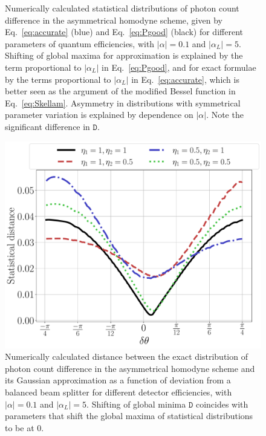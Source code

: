 \begin{figure}
\begin{minipage}[c]{.45\linewidth}
\end{minipage}
    \caption{
    Numerically calculated statistical distributions of photon count difference in the asymmetrical homodyne scheme, given by  Eq.~\eqref{eq:accurate} (blue) and Eq.~\eqref{eq:Pgood} (black) for different parameters of quantum efficiencies, with $|\alpha|=0.1$ and $|\alpha_L|=5$. Shifting of global maxima for approximation is explained by the term proportional to $|\alpha_L|$ in Eq.~\eqref{eq:Pgood}, and for exact formulae by the terms proportional to $|\alpha_L|$ in Eq.~\eqref{eq:accurate}, which is better seen as the argument of the modified Bessel function in Eq.~\eqref{eq:Skellam}. Asymmetry in distributions with symmetrical parameter variation is explained by dependence on $|\alpha|$. Note the significant difference in $\mathtt{D}$.
    }\label{fig:PLACEHOLDER}
\end{figure}

\begin{figure}
    \centering
    \includegraphics[width=0.75\linewidth]{pics/homodyne/full.pdf}
    \caption{Numerically calculated distance between the exact distribution of photon count difference in the asymmetrical homodyne scheme and its Gaussian approximation as a function of deviation from a balanced beam splitter for different detector efficiencies, with $|\alpha|=0.1$ and $|\alpha_L|=5$. Shifting of global minima $\mathtt{D}$ coincides with parameters that shift the global maxima of statistical distributions to be at $0$.}%
    \label{fig:delta-theta}
\end{figure}


